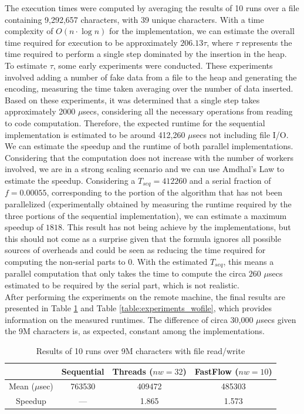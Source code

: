 \documentclass[10pt]{article}
\begin{document}
The execution times were computed by averaging the results of 10 runs over a file containing 9,292,657 characters, with 39 unique characters. With a time complexity of $O(n\cdot\log n)$ for the implementation, we can estimate the overall time required for execution to be approximately $206.13\tau$, where $\tau$ represents the time required to perform a single step dominated by the insertion in the heap.\\
To estimate $\tau$, some early experiments were conducted. These experiments involved adding a number of fake data from a file to the heap and generating the encoding, measuring the time taken averaging over the number of data inserted. Based on these experiments, it was determined that a single step takes approximately 2000 $\mu$secs, considering all the necessary operations from reading to code computation. Therefore, the expected runtime for the sequential implementation is estimated to be around 412,260 $\mu$secs not including file I/O.\\
We can estimate the speedup and the runtime of both parallel implementations. Considering that the computation does not increase with the number of workers involved, we are in a strong scaling scenario and we can use Amdhal's Law to estimate the speedup. Considering a $T_{seq}= 412260$ and a serial fraction of $f = 0.00055$, corresponding to the portion of the algorithm that has not been parallelized (experimentally obtained by measuring the runtime required by the three portions of the sequential implementation), we can estimate a maximum speedup of $1818$. This result has not being achieve by the implementations, but this should not come as a surprise given that the formula ignores all possible sources of overheads and could be seen as reducing the time required for computing the non-serial parts to 0. With the estimated $T_{seq}$, this means a parallel computation that only takes the time to compute the circa $260$ $\mu$secs estimated to be required by the serial part, which is not realistic.\\
After performing the experiments on the remote machine, the final results are presented in Table \ref{table:experiments_wfile} and Table \ref{table:experiments_wofile}, which provides information on the measured runtimes. The difference of circa 30,000 $\mu$secs given the 9M characters is, as expected, constant among the implementations.
\begin{table}[H]
\begin{center}
	\begin{tabular}{c || c | c | c}
	& Sequential & Threads ($nw = 32$) & FastFlow ($nw = 10$)\\
	\hline
	Mean ($\mu$sec) & 763530 & 409472 & 485303 \\
	\hline
	Speedup & --- & 1.865 & 1.573
	\end{tabular}
\end{center}
\caption{Results of 10 runs over 9M characters with file read/write}
\label{table:experiments_wfile}
\end{table}
\end{document}
